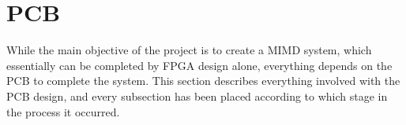 
\clearpage

\section{PCB}\label{section:pcb}

While the main objective of the project is to create a MIMD system, which
essentially can be completed by FPGA design alone, everything depends on the PCB
to complete the system. This section describes everything involved with the PCB
design, and every subsection has been placed according to which stage in the
process it occurred.




